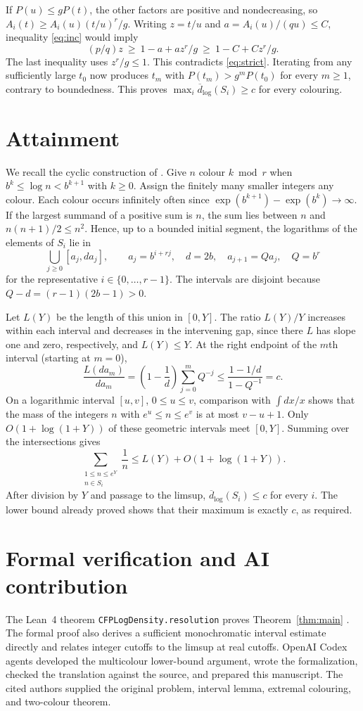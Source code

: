 \documentclass[11pt]{article}
\newcommand{\dd}{\overline d_{\log}}
\begin{document}
If $P(u)\le gP(t)$, the other factors are positive and nondecreasing, so $A_i(t)\ge A_i(u)(t/u)^r/g$.
Writing $z=t/u$ and $a=A_i(u)/(qu)\le C$, inequality \eqref{eq:inc}
would imply
\[
 (p/q)z\ \ge\ 1-a+az^r/g\ \ge\ 1-C+Cz^r/g .
\]
The last inequality uses $z^r/g\le1$. This contradicts
\eqref{eq:strict}. Iterating from any sufficiently large $t_0$ now
produces $t_m$ with $P(t_m)>g^mP(t_0)$ for every $m\ge1$, contrary
to boundedness. This proves $\max_i\dd(S_i)\ge c$ for every colouring.

\section{Attainment}

We recall the cyclic construction of \cite[Theorem~1]{cfp}. Give
$n$ colour $k\bmod r$ when $b^k\le\log n<b^{k+1}$ with $k\ge0$.
Assign the finitely many smaller integers any colour. Each colour occurs
infinitely often since $\exp(b^{k+1})-\exp(b^k)\to\infty$.
If the largest summand of a positive sum is $n$, the sum lies between
$n$ and $n(n+1)/2\le n^2$. Hence, up to a bounded initial segment,
the logarithms of the elements of $S_i$ lie in
\[
 \bigcup_{j\ge0}[a_j,da_j],\qquad a_j=b^{i+rj},\quad d=2b,
 \quad a_{j+1}=Qa_j,\quad Q=b^r
\]
for the representative $i\in\{0,\ldots,r-1\}$. The intervals are
disjoint because $Q-d=(r-1)(2b-1)>0$.

Let $L(Y)$ be the length of this union in $[0,Y]$. The ratio $L(Y)/Y$
increases within each interval and decreases in the intervening gap,
since there $L$ has slope one and zero, respectively, and $L(Y)\le Y$.
At the right endpoint of the $m$th interval (starting at $m=0$),
\[
 \frac{L(da_m)}{da_m}=\left(1-\frac1d\right)
          \sum_{j=0}^{m}Q^{-j}
 \le\frac{1-1/d}{1-Q^{-1}}=c .
\]
On a logarithmic interval $[u,v]$, $0\le u\le v$, comparison with
$\int dx/x$ shows that the mass of the integers $n$ with
$e^u\le n\le e^v$ is at most $v-u+1$. Only $O(1+\log(1+Y))$
of these geometric intervals meet $[0,Y]$. Summing over the
intersections gives
\[
 \sum_{\substack{1\le n\le e^Y\\ n\in S_i}}\frac1n
 \le L(Y)+O(1+\log(1+Y)).
\]
After division by $Y$ and passage to the limsup, $\dd(S_i)\le c$ for
every $i$. The lower bound already proved shows that their maximum is
exactly $c$, as required.

\section*{Formal verification and AI contribution}
The Lean~4 theorem \texttt{CFPLogDensity.\allowbreak resolution}
proves Theorem~\ref{thm:main} \cite{formal}. The formal proof also derives a sufficient monochromatic
interval estimate directly and relates integer cutoffs to the limsup at
real cutoffs. OpenAI Codex agents developed the multicolour lower-bound
argument, wrote the formalization, checked the translation against the
source, and prepared this manuscript. The cited authors supplied the
original problem, interval lemma, extremal colouring, and two-colour
theorem.
\end{document}
